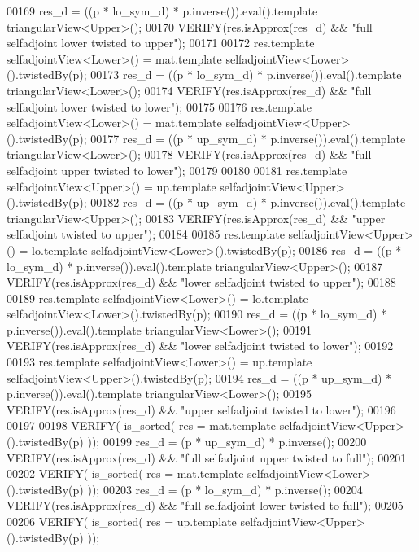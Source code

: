 \begin{DoxyCode}
00169   res\_d = ((p * lo\_sym\_d) * p.inverse()).eval().template triangularView<Upper>();
00170   VERIFY(res.isApprox(res\_d) && \textcolor{stringliteral}{"full selfadjoint lower twisted to upper"});
00171   
00172   res.template selfadjointView<Lower>() = mat.template selfadjointView<Lower>().twistedBy(p);
00173   res\_d = ((p * lo\_sym\_d) * p.inverse()).eval().template triangularView<Lower>();
00174   VERIFY(res.isApprox(res\_d) && \textcolor{stringliteral}{"full selfadjoint lower twisted to lower"});
00175   
00176   res.template selfadjointView<Lower>() = mat.template selfadjointView<Upper>().twistedBy(p);
00177   res\_d = ((p * up\_sym\_d) * p.inverse()).eval().template triangularView<Lower>();
00178   VERIFY(res.isApprox(res\_d) && \textcolor{stringliteral}{"full selfadjoint upper twisted to lower"});
00179   
00180   
00181   res.template selfadjointView<Upper>() = up.template selfadjointView<Upper>().twistedBy(p);
00182   res\_d = ((p * up\_sym\_d) * p.inverse()).eval().template triangularView<Upper>();
00183   VERIFY(res.isApprox(res\_d) && \textcolor{stringliteral}{"upper selfadjoint twisted to upper"});
00184   
00185   res.template selfadjointView<Upper>() = lo.template selfadjointView<Lower>().twistedBy(p);
00186   res\_d = ((p * lo\_sym\_d) * p.inverse()).eval().template triangularView<Upper>();
00187   VERIFY(res.isApprox(res\_d) && \textcolor{stringliteral}{"lower selfadjoint twisted to upper"});
00188   
00189   res.template selfadjointView<Lower>() = lo.template selfadjointView<Lower>().twistedBy(p);
00190   res\_d = ((p * lo\_sym\_d) * p.inverse()).eval().template triangularView<Lower>();
00191   VERIFY(res.isApprox(res\_d) && \textcolor{stringliteral}{"lower selfadjoint twisted to lower"});
00192   
00193   res.template selfadjointView<Lower>() = up.template selfadjointView<Upper>().twistedBy(p);
00194   res\_d = ((p * up\_sym\_d) * p.inverse()).eval().template triangularView<Lower>();
00195   VERIFY(res.isApprox(res\_d) && \textcolor{stringliteral}{"upper selfadjoint twisted to lower"});
00196 
00197   
00198   VERIFY( is\_sorted( res = mat.template selfadjointView<Upper>().twistedBy(p) ));
00199   res\_d = (p * up\_sym\_d) * p.inverse();
00200   VERIFY(res.isApprox(res\_d) && \textcolor{stringliteral}{"full selfadjoint upper twisted to full"});
00201   
00202   VERIFY( is\_sorted( res = mat.template selfadjointView<Lower>().twistedBy(p) ));
00203   res\_d = (p * lo\_sym\_d) * p.inverse();
00204   VERIFY(res.isApprox(res\_d) && \textcolor{stringliteral}{"full selfadjoint lower twisted to full"});
00205   
00206   VERIFY( is\_sorted( res = up.template selfadjointView<Upper>().twistedBy(p) ));

\end{DoxyCode}

